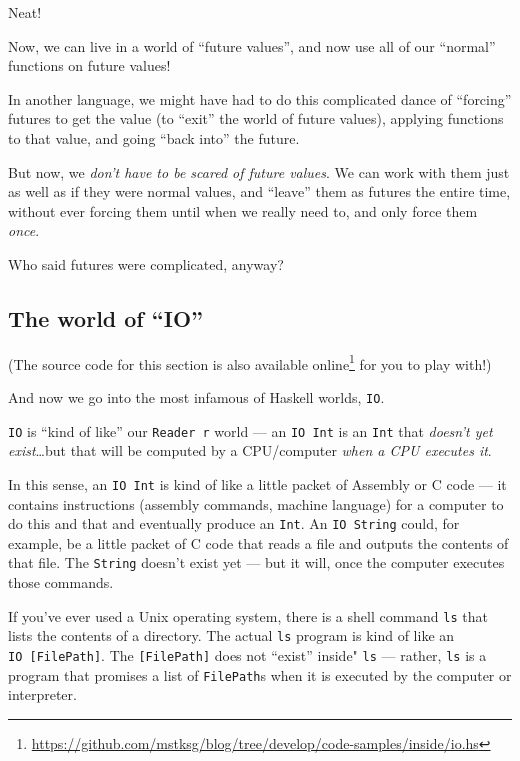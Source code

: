 \documentclass[]{article}
\renewcommand{\href}[2]{#2\footnote{\url{#1}}}
\begin{document}
Neat!

Now, we can live in a world of ``future values'', and now use all of our ``normal'' functions on
future values!

In another language, we might have had to do this complicated dance of ``forcing'' futures to get
the value (to ``exit'' the world of future values), applying functions to that value, and going
``back into'' the future.

But now, we \emph{don't have to be scared of future values}. We can work with them just as well as
if they were normal values, and ``leave'' them as futures the entire time, without ever forcing them
until when we really need to, and only force them \emph{once}.

Who said futures were complicated, anyway?

\subsection{\texorpdfstring{The world of ``IO''}{The world of IO}}\label{the-world-of-io}

(The source code for this section is
\href{https://github.com/mstksg/blog/tree/develop/code-samples/inside/io.hs}{also available online}
for you to play with!)

And now we go into the most infamous of Haskell worlds, \texttt{IO}.

\texttt{IO} is ``kind of like'' our \texttt{Reader\ r} world --- an \texttt{IO\ Int} is an
\texttt{Int} that \emph{doesn't yet exist}\ldots{}but that will be computed by a CPU/computer
\emph{when a CPU executes it}.

In this sense, an \texttt{IO\ Int} is kind of like a little packet of Assembly or C code --- it
contains instructions (assembly commands, machine language) for a computer to do this and that and
eventually produce an \texttt{Int}. An \texttt{IO\ String} could, for example, be a little packet of
C code that reads a file and outputs the contents of that file. The \texttt{String} doesn't exist
yet --- but it will, once the computer executes those commands.

If you've ever used a Unix operating system, there is a shell command \texttt{ls} that lists the
contents of a directory. The actual \texttt{ls} program is kind of like an
\texttt{IO\ {[}FilePath{]}}. The \texttt{{[}FilePath{]}} does not ``exist'' inside" \texttt{ls} ---
rather, \texttt{ls} is a program that promises a list of \texttt{FilePath}s when it is executed by
the computer or interpreter.
\end{document}
